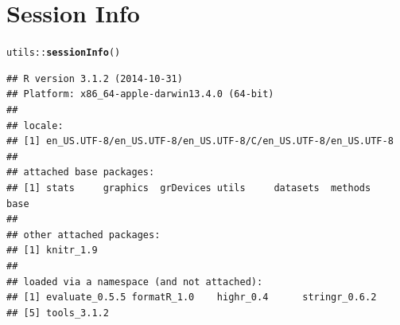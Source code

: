 \documentclass[10pt]{article}\usepackage[]{graphicx}\usepackage[]{color}
\makeatletter
\newcommand{\hlopt}[1]{\textcolor[rgb]{0,0,0}{#1}}%
\newcommand{\hlstd}[1]{\textcolor[rgb]{0.345,0.345,0.345}{#1}}%
\newcommand{\hlkwd}[1]{\textcolor[rgb]{0.737,0.353,0.396}{\textbf{#1}}}%
\newenvironment{kframe}{%
 \def\at@end@of@kframe{}%
 \ifinner\ifhmode%
  \def\at@end@of@kframe{\end{minipage}}%
  \begin{minipage}{\columnwidth}%
 \fi\fi%
 \def\FrameCommand##1{\hskip\@totalleftmargin \hskip-\fboxsep
 \colorbox{shadecolor}{##1}\hskip-\fboxsep
     \hskip-\linewidth \hskip-\@totalleftmargin \hskip\columnwidth}%
 \MakeFramed {\advance\hsize-\width
   \@totalleftmargin\z@ \linewidth\hsize
   \@setminipage}}%
 {\par\unskip\endMakeFramed%
 \at@end@of@kframe}
\newenvironment{knitrout}{}{} %
\makeatother
\begin{document}

\section*{Session Info}
\begin{knitrout}
\color{fgcolor}\begin{kframe}
\begin{alltt}
\hlstd{utils}\hlopt{::}\hlkwd{sessionInfo}\hlstd{()}
\end{alltt}
\begin{verbatim}
## R version 3.1.2 (2014-10-31)
## Platform: x86_64-apple-darwin13.4.0 (64-bit)
## 
## locale:
## [1] en_US.UTF-8/en_US.UTF-8/en_US.UTF-8/C/en_US.UTF-8/en_US.UTF-8
## 
## attached base packages:
## [1] stats     graphics  grDevices utils     datasets  methods   base     
## 
## other attached packages:
## [1] knitr_1.9
## 
## loaded via a namespace (and not attached):
## [1] evaluate_0.5.5 formatR_1.0    highr_0.4      stringr_0.6.2 
## [5] tools_3.1.2
\end{verbatim}
\end{kframe}
\end{knitrout}



\end{document}

